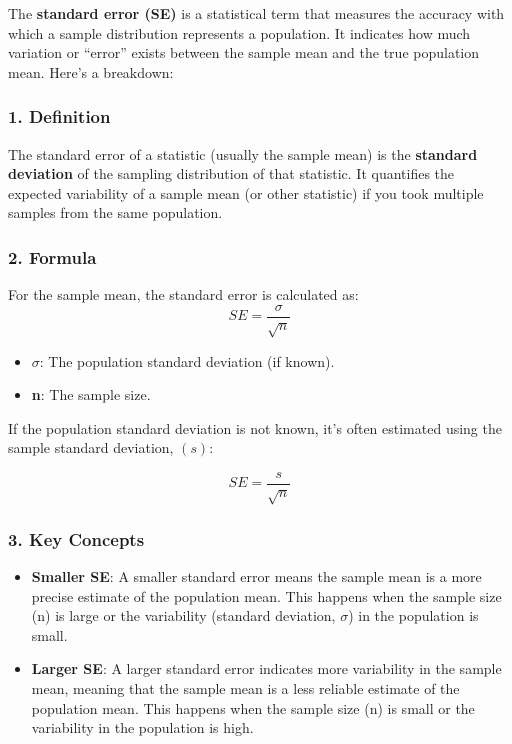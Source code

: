 \documentclass[12pt]{book}
\providecommand{\tightlist}{%
  \setlength{\itemsep}{0pt}\setlength{\parskip}{0pt}}
\begin{document}
The \textbf{standard error (SE)} is a statistical term that measures the
accuracy with which a sample distribution represents a population. It
indicates how much variation or ``error'' exists between the sample mean
and the true population mean. Here's a breakdown:

\subsubsection{\texorpdfstring{1.
\textbf{Definition}}{1. Definition}}\label{definition}

The standard error of a statistic (usually the sample mean) is the
\textbf{standard deviation} of the sampling distribution of that
statistic. It quantifies the expected variability of a sample mean (or
other statistic) if you took multiple samples from the same population.

\subsubsection{\texorpdfstring{2.
\textbf{Formula}}{2. Formula}}\label{formula}

For the sample mean, the standard error is calculated as: \[
SE = \frac{\sigma}{\sqrt{n}}
\]

\begin{itemize}
\tightlist
\item
  \(\sigma\): The population standard deviation (if known).
\item
  \textbf{n}: The sample size.
\end{itemize}

If the population standard deviation is not known, it's often estimated
using the sample standard deviation, \((s):\)

\[
SE = \frac{s}{\sqrt{n}}
\]

\subsubsection{\texorpdfstring{3. \textbf{Key
Concepts}}{3. Key Concepts}}\label{key-concepts}

\begin{itemize}
\item
  \textbf{Smaller SE}: A smaller standard error means the sample mean is
  a more precise estimate of the population mean. This happens when the
  sample size (n) is large or the variability (standard deviation, \(\sigma\))
  in the population is small.
\item
  \textbf{Larger SE}: A larger standard error indicates more variability
  in the sample mean, meaning that the sample mean is a less reliable
  estimate of the population mean. This happens when the sample size (n)
  is small or the variability in the population is high.
\end{itemize}
\end{document}
